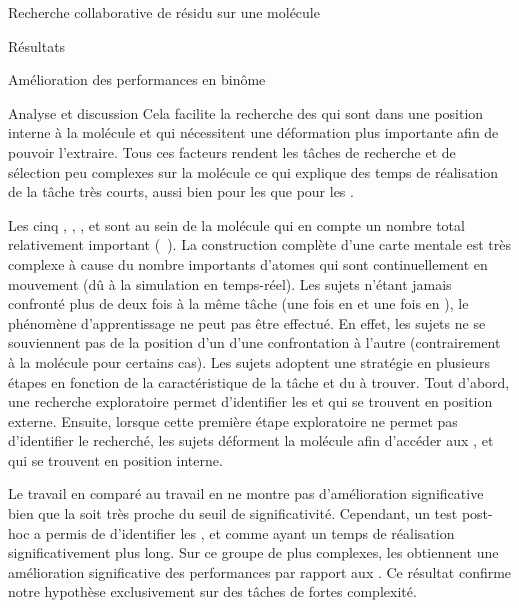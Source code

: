 \documentclass[myfrancais,ngerman,english,french]{mythesis}
\begin{document}
\begin{mychapter}{Recherche collaborative de résidu sur une molécule}
\begin{mysection}{Résultats}
\begin{mysubsection}{Amélioration des performances en binôme}
\begin{mysubsubsection}{Analyse et discussion}
					Cela facilite la recherche des  qui sont dans une position interne à la molécule et qui nécessitent une déformation plus importante afin de pouvoir l'extraire.
					Tous ces facteurs rendent les tâches de recherche et de sélection peu complexes sur la molécule \myTRPCAGE ce qui explique des temps de réalisation de la tâche très courts, aussi bien pour les  que pour les .

					Les cinq  , , ,  et  sont au sein de la molécule \myPrion qui en compte un nombre total relativement important (~).
					La construction complète d'une carte mentale est très complexe à cause du nombre importants d'atomes qui sont continuellement en mouvement (dû à la simulation en temps-réel).
					Les sujets n'étant jamais confronté plus de deux fois à la même tâche (une fois en  et une fois en ), le phénomène d'apprentissage ne peut pas être effectué.
					En effet, les sujets ne se souviennent pas de la position d'un  d'une confrontation à l'autre (contrairement à la molécule \myTRPCAGE pour certains cas).
					Les sujets adoptent une stratégie en plusieurs étapes en fonction de la caractéristique de la tâche et du  à trouver.
					Tout d'abord, une recherche exploratoire permet d'identifier les   et  qui se trouvent en position externe.
					Ensuite, lorsque cette première étape exploratoire ne permet pas d'identifier le  recherché, les sujets déforment la molécule afin d'accéder aux  ,  et  qui se trouvent en position interne.

					Le travail en  comparé au travail en  ne montre pas d'amélioration significative bien que la \mypvalue soit très proche du seuil de significativité.
					Cependant, un test post-hoc a permis de d'identifier les  ,  et  comme ayant un temps de réalisation significativement plus long.
					Sur ce groupe de  plus complexes, les  obtiennent une amélioration significative des performances par rapport aux .
					Ce résultat confirme notre hypothèse  exclusivement sur des tâches de fortes complexité.


\end{mysubsubsection}
\end{mysubsection}
\end{mysection}
\end{mychapter}
\end{document}
